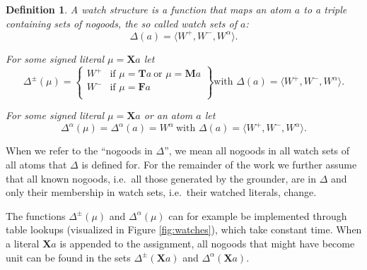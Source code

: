 \documentclass{vutinfth} %
\newtheorem{definition}{Definition}[chapter]
\newcommand{\bT}{\mathbf{T}}
\newcommand{\bM}{\mathbf{M}}
\newcommand{\bF}{\mathbf{F}}
\newcommand{\bX}{\mathbf{X}}
\newcommand{\dpm}{\Delta^\pm}
\newcommand{\dal}{\Delta^\alpha}
\newcommand{\sgl}{\mu}
\begin{document}
\begin{definition}
A \emph{watch structure} is a function that maps an atom $a$ to a triple containing sets of nogoods, the so called \emph{watch sets} of $a$: $$\Delta(a) = \langle W^+, W^-, W^\alpha \rangle .$$


For some signed literal $\sgl = \bX a$ let $$\dpm(\sgl) = \left\{\begin{array}{ll}
        W^+ & \text{if } \sgl = \bT a \ \text{or } \sgl = \bM a\\
        W^- & \text{if } \sgl = \bF a \\
        \end{array}\right\} \text{with } \Delta(a) = \langle W^+, W^-, W^\alpha \rangle .$$

For some signed literal $\sgl = \bX a$ or an atom $a$ let $$\dal(\sgl) = \dal(a) = W^\alpha \ \text{with } \Delta(a) = \langle W^+, W^-, W^\alpha \rangle .$$
\end{definition}

When we refer to the \enquote{nogoods in $\Delta$}, we mean all nogoods in all watch sets of all atoms that $\Delta$ is defined for. For the remainder of the work we further assume that all known nogoods, i.e.~all those generated by the grounder, are in $\Delta$ and only their membership in watch sets, i.e.~their watched literals, change.

The functions $\dpm(\sgl)$ and $\dal(\sgl)$ can for example be implemented through table lookups (visualized in Figure \ref{fig:watches}), which take constant time. When a literal $\bX a$ is appended to the assignment, all nogoods that might have become unit can be found in the sets $\dpm(\bX a)$ and $\dal(\bX a)$.

\end{document}
